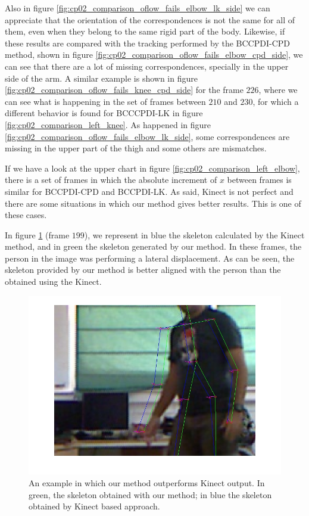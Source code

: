 Also in figure 
\ref{fig:cp02_comparison_oflow_fails_elbow_lk_side} we can appreciate that the 
orientation of the correspondences is not the same for all of them, even when they belong to the same rigid part of the 
body. Likewise, if these results are compared with the tracking performed by the BCCPDI-CPD method, shown in figure 
\ref{fig:cp02_comparison_oflow_fails_elbow_cpd_side}, we can see that there are a lot of missing correspondences, specially 
in the upper side of the arm. A similar example is shown in figure \ref{fig:cp02_comparison_oflow_fails_knee_cpd_side} for 
the frame $226$, where we can see what is happening in the set of frames between $210$ and $230$, for which a 
different behavior is found for BCCCPDI-LK in figure \ref{fig:cp02_comparison_left_knee}. As happened in figure 
\ref{fig:cp02_comparison_oflow_fails_elbow_lk_side}, some correspondences are missing in the upper part of the thigh and some 
others are mismatches.

If we have a look at the upper chart in figure \ref{fig:cp02_comparison_left_elbow}, there is a set of frames in which the 
absolute increment of $x$ between frames is similar for BCCPDI-CPD and BCCPDI-LK. As said, Kinect is not perfect and 
there are some situations in which our method gives better results. This is one of these cases. 

In figure \ref{fig:cp02_comparison_kinect_fails} (frame $199$), we represent in blue the skeleton calculated by the 
Kinect method, and in green the skeleton generated by our method. In these frames, the person in the 
image was performing a lateral displacement. As can be seen, the skeleton provided by our method is better aligned with
the person than the obtained using the Kinect. 

\begin{figure}[h!]
  \centering
  \includegraphics[width=0.5\columnwidth, trim=0 0 0 0,clip]{fig34.jpg}
  \caption{An example in which our method outperforms Kinect output. In green, the skeleton obtained with our method; in blue the skeleton obtained by Kinect based approach.}
  \label{fig:cp02_comparison_kinect_fails}
\end{figure}

